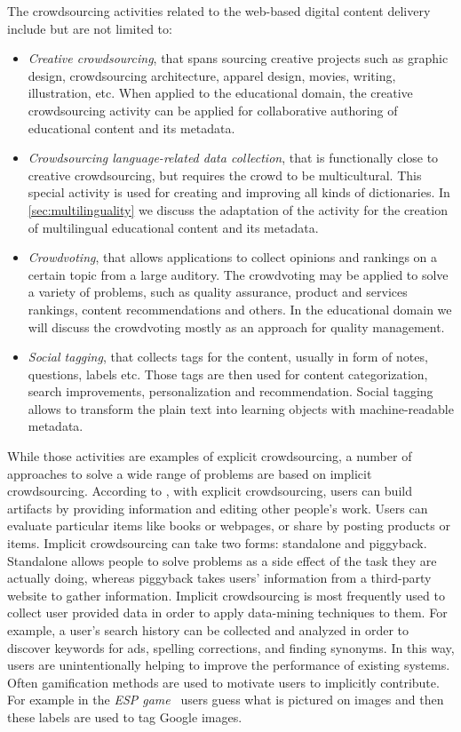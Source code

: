 \documentclass[ngerman,UKenglish,table]{scrbook}
\begin{document}
The crowdsourcing activities related to the web-based digital content delivery include but are not limited to:

\begin{itemize}
\item \emph{Creative crowdsourcing}, that spans sourcing creative projects such as graphic design, crowdsourcing architecture, apparel design, movies, writing, illustration, etc.
When applied to the educational domain, the creative crowdsourcing activity can be applied for collaborative authoring of educational content and its metadata.
\item \emph{Crowdsourcing language-related data collection}, that is functionally close to creative crowdsourcing, but requires the crowd to be multicultural.
This special activity is used for creating and improving all kinds of dictionaries.
In \autoref{sec:multilinguality} we discuss the adaptation of the activity for the creation of multilingual educational content and its metadata.
\item \emph{Crowdvoting}, that allows applications to collect opinions and rankings on a certain topic from a large auditory.
The crowdvoting may be applied to solve a variety of problems, such as quality assurance, product and services rankings, content recommendations and others.
In the educational domain we will discuss the crowdvoting mostly as an approach for quality management.
\item \emph{Social tagging}, that collects tags for the content, usually in form of notes, questions, labels  etc. 
Those tags are then used for content categorization, search improvements, personalization and recommendation.
Social tagging allows to transform the plain text into learning objects with machine-readable metadata. 
\end{itemize}

While those activities are examples of explicit crowdsourcing, a number of approaches to solve a wide range of problems are based on implicit crowdsourcing.
According to \cite{doan2011crowdsourcing}, with explicit crowdsourcing, users can build artifacts by providing information and editing other people's work.
Users can evaluate particular items like books or webpages, or share by posting products or items.
Implicit crowdsourcing can take two forms: standalone and piggyback.
Standalone allows people to solve problems as a side effect of the task they are actually doing, whereas piggyback takes users' information from a third-party website to gather information.
Implicit crowdsourcing is most frequently used to collect user provided data in order to apply data-mining techniques to them.
For example, a user's search history can be collected and analyzed in order to discover keywords for ads, spelling corrections, and finding synonyms.
In this way, users are unintentionally helping to improve the performance of existing systems.
Often gamification methods are used to motivate users to implicitly contribute.
For example in the \emph{ESP game}~\cite{von2004labeling} users guess what is pictured on images and then these labels are used to tag Google images.
\end{document}
